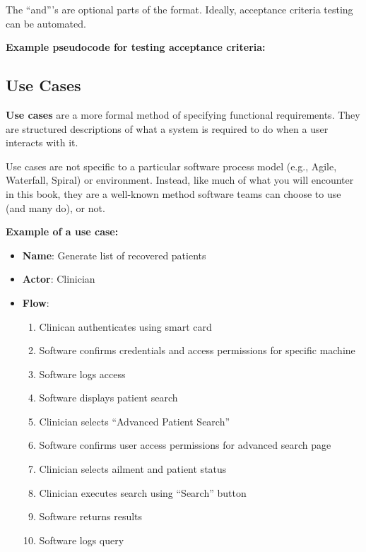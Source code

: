 The ``and'''s are optional parts of the format. Ideally, acceptance criteria testing can be automated.

\spacer
\noindent\textbf{Example pseudocode for testing acceptance criteria:}



\subsection{Use Cases}

\marginpar{\useCaseDef}\textbf{Use cases} are a more formal method of specifying functional requirements. They are structured descriptions of what a system is required to do when a user interacts with it.

Use cases are not specific to a particular software process model (e.g., Agile, Waterfall, Spiral) or environment. Instead, like much of what you will encounter in this book, they are a well-known method software teams can choose to use (and many do), or not.

\spacer
{}\textbf{Example of a use case:}
\spacer

\begin{itemize}
\item{\textbf{Name}: Generate list of recovered patients}
\item{\textbf{Actor}: Clinician}
\item{
\textbf{Flow}:
\begin{enumerate}
\item Clinican authenticates using smart card
\item Software confirms credentials and access permissions for specific machine
\item Software logs access
\item Software displays patient search
\item Clinician selects ``Advanced Patient Search''
\item Software confirms user access permissions for advanced search page
\item Clinician selects ailment and patient status
\item Clinician executes search using ``Search'' button
\item Software returns results
\item Software logs query
\end{enumerate}
}
\end{itemize}

